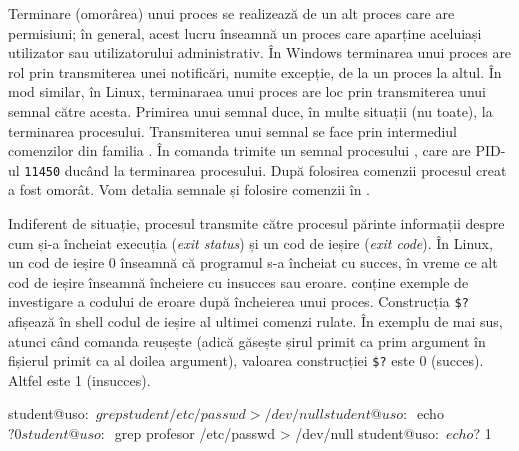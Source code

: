 Terminare (omorârea) unui proces se realizează de un alt proces care are permisiuni; în
general, acest lucru înseamnă un proces care aparține aceluiași utilizator sau
utilizatorului administrativ. În Windows terminarea unui proces are rol prin
transmiterea unei notificări, numite excepție, de la un proces la altul. În mod
similar, în Linux, terminaraea unui proces are loc prin transmiterea unui semnal
către acesta. Primirea unui semnal duce, în multe situații (nu toate), la
terminarea procesului. Transmiterea unui semnal se face prin intermediul
comenzilor din familia .
În  comanda  trimite un semnal procesului , care are PID-ul \texttt{11450} ducând la terminarea procesului.
După folosirea comenzii  procesul creat a fost omorât. Vom detalia semnale
și folosire comenzii  în
.


Indiferent de situație, procesul transmite către procesul părinte informații
despre cum și-a încheiat execuția (\textit{exit status}) și un cod de ieșire
(\textit{exit code}). În Linux, un cod de ieșire 0 înseamnă că programul s-a
încheiat cu succes, în vreme ce alt cod de ieșire înseamnă încheiere cu insucces
sau eroare.  conține exemple de investigare a codului de eroare după
încheierea unui proces.
Construcția \texttt{\$?} afișează în shell codul de ieșire al ultimei comenzi rulate. În exemplu de mai sus, atunci când comanda  reușește (adică găsește șirul primit ca prim argument în fișierul primit ca al doilea argument), valoarea construcției \texttt{\$?} este 0 (succes). Altfel este 1 (insucces).

\begin{screen}[caption={Investigarea codului de ieșire al unui process},label={lst:process:exit-code}]
student@uso:~$ grep student /etc/passwd > /dev/null
student@uso:~$ echo $?
0
student@uso:~$ grep profesor /etc/passwd > /dev/null
student@uso:~$ echo $?
1
\end{screen}

